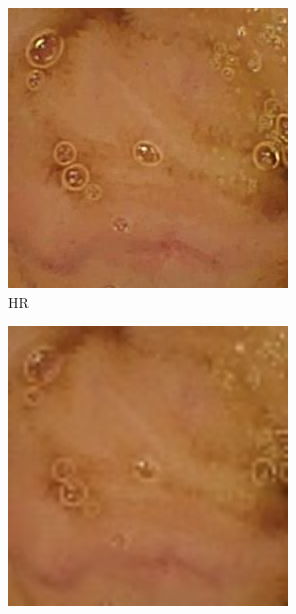 \begin{figure}[H]
    \centering
    \begin{subfigure}[b]{0.275\textwidth}
    \includegraphics[width=\textwidth]{Chapter7/hr_9.jpg}
    \caption{HR}
  \end{subfigure}
  \begin{subfigure}[b]{0.275\textwidth}
    \includegraphics[width=\textwidth]{Chapter7/Bicubic_9.jpg}

\end{subfigure}
\end{figure}
